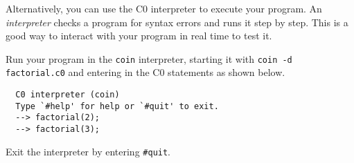 Alternatively, you can use the C0 interpreter to execute your program.
An \emph{interpreter} checks a program for syntax errors
and runs it step by step.  This is a good way to interact with your
program in real time to test it.

\begin{part}
  Run your program in the \lstinline[language={[coin]C}]'coin'
  interpreter, starting it with %
  \lstinline[language={[coin]C}]'coin -d  factorial.c0' %
  and entering in the C0 statements as shown below.
\begin{lstlisting}[language={[coin]C}, belowskip=-2ex]
  % coin -d factorial.c0
  C0 interpreter (coin)
  Type `#help' for help or `#quit' to exit.
  --> factorial(2);
  --> factorial(3);
\end{lstlisting}
\end{part}
Exit the interpreter by entering \lstinline[language={[coin]C}]'#quit'.

\begin{comment}
Some of the outputs \lstinline[language={[coin]C}]'coin' gives should
strike you as odd. We'll learn about what's going on in class.

\begin{part}\TAGS{intepreter}
  Factorial $n!$ is only defined on non-negative numbers. Try to
  compute a non-existent factorial:
\begin{lstlisting}[language={[coin]C}, belowskip=-1.5ex]
  --> factorial(-1);
\end{lstlisting}
\end{part}

You should see an annotation failure.  This is because our factorial
function starts with the requirement: \lstinline'//@requires n >= 0;'.
Since we called this function with a value for $n$ that does not
satisfy this requirement, we get an annotation failure since it
doesn't make sense to run this function with $n = -1$.

\begin{part}\TAGS{intepreter}
  Exit the interpreter by entering
  \lstinline[language={[coin]C}]'#quit'.  Start it again, this time without the
  \lstinline[language={[coin]C}]'-d' flag by typing
  \lstinline[language={[coin]C}]'coin factorial.c0' at the prompt.  Now, run
  \lstinline[language={[coin]C}]'factorial(-1);' again.  What do you observe?
\end{part}
\end{comment}
